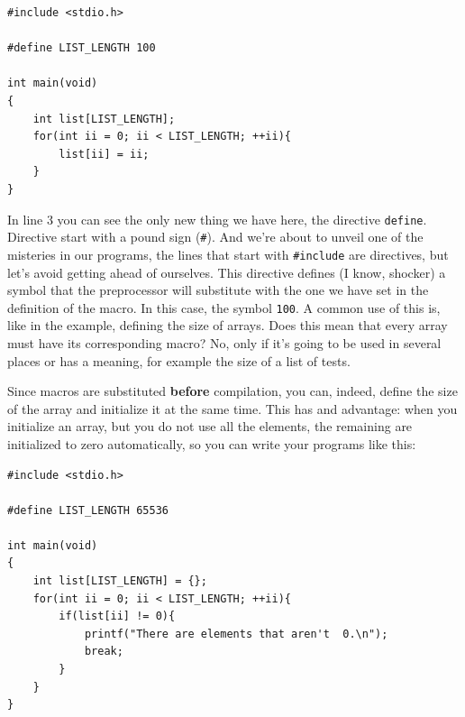 \documentclass[a4paper]{article}
\begin{document}
\noindent
\begin{minipage}[H]{\linewidth}
\mbox{}
\begin{lstlisting}[style=C,
caption={Macro creation},
label={lst:defineDirective}]
#include <stdio.h>

#define LIST_LENGTH 100

int main(void)
{
    int list[LIST_LENGTH];
    for(int ii = 0; ii < LIST_LENGTH; ++ii){
        list[ii] = ii;
    }
}
\end{lstlisting}
\end{minipage}

In line 3 you can see the only new thing we have here, the directive
\verb!define!. Directive start with a pound sign (\verb!#!). And we're about to
unveil one of the misteries in our programs, the lines that start with
\verb!#include! are directives, but let's avoid getting ahead of ourselves.
This directive defines (I know, shocker) a symbol that the preprocessor will
substitute with the one we have set in the definition of the macro. In this
case, the symbol \verb"100". A common use of this is, like in the example,
defining the size of arrays. Does this mean that every array must have its
corresponding macro? No, only if it's going to be used in several places or has
a meaning, for example the size of a list of tests.

Since macros are substituted \textbf{before} compilation, you can, indeed,
define the size of the array and initialize it at the same time. This has and
advantage: when you initialize an array, but you do not use all the elements,
the remaining are initialized to zero automatically, so you can write your
programs like this:

\noindent
\begin{minipage}[H]{\linewidth}
\mbox{}
\begin{lstlisting}[style=C,
caption={Macro use with arrays},
label={lst:defineArray}]
#include <stdio.h>

#define LIST_LENGTH 65536

int main(void)
{
    int list[LIST_LENGTH] = {};
    for(int ii = 0; ii < LIST_LENGTH; ++ii){
        if(list[ii] != 0){
            printf("There are elements that aren't  0.\n");
            break;
        }
    }
}
\end{lstlisting}
\end{minipage}
\end{document}
